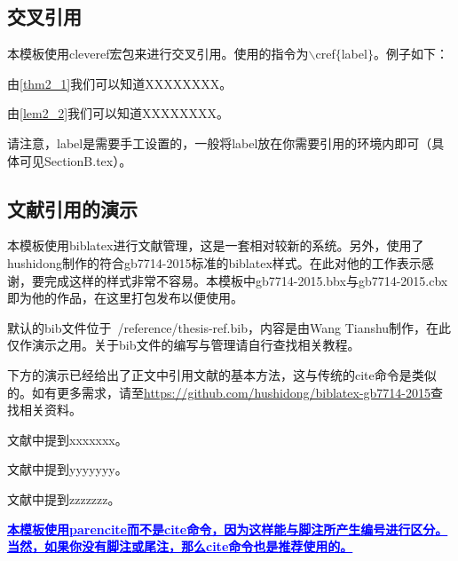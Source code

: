 \subsection{交叉引用}
\par 本模板使用cleveref宏包来进行交叉引用。使用的指令为$\backslash$cref$\{$label$\}$。例子如下：
\par 由\cref{thm2_1}我们可以知道XXXXXXXX。
\par 由\cref{lem2_2}我们可以知道XXXXXXXX。
\par 请注意，label是需要手工设置的，一般将label放在你需要引用的环境内即可（具体可见SectionB.tex）。

\subsection{文献引用的演示}
\par 本模板使用biblatex进行文献管理，这是一套相对较新的系统。另外，使用了hushidong制作的符合gb7714-2015标准的biblatex样式。在此对他的工作表示感谢，要完成这样的样式非常不容易。本模板中gb7714-2015.bbx与gb7714-2015.cbx即为他的作品，在这里打包发布以便使用。
\par 默认的bib文件位于~/reference/thesis-ref.bib，内容是由Wang Tianshu制作，在此仅作演示之用。关于bib文件的编写与管理请自行查找相关教程。
\par 下方的演示已经给出了正文中引用文献的基本方法，这与传统的cite命令是类似的。如有更多需求，请至\url{https://github.com/hushidong/biblatex-gb7714-2015}查找相关资料。
\par 文献\parencite{Yang_Hy200215}中提到xxxxxxx。
\par 文献\parencite{Joa1999}中提到yyyyyyy。
\par 文献\parencite{Altman1997}中提到zzzzzzz。
\par \textcolor{blue}{\textbf{\uline{本模板使用parencite而不是cite命令，因为这样能与脚注所产生编号进行区分。当然，如果你没有脚注或尾注，那么cite命令也是推荐使用的。}}}

